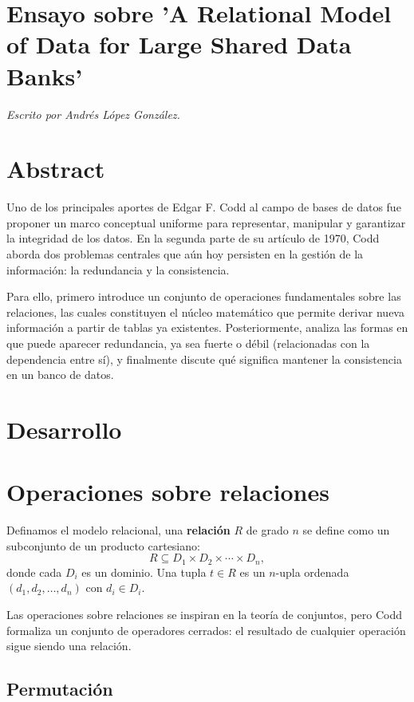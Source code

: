 \documentclass{article}
\begin{document}
\section*{Ensayo sobre 'A Relational Model of Data for Large Shared Data Banks'}
\textit{Escrito por Andrés López González.}
\section*{Abstract}
Uno de los principales aportes de Edgar F. Codd al campo de bases de datos fue proponer un marco conceptual uniforme para representar, manipular y garantizar la integridad de los datos. En la segunda parte de su artículo de 1970, Codd aborda dos problemas centrales que aún hoy persisten en la gestión de la información: la redundancia y la consistencia.

Para ello, primero introduce un conjunto de operaciones fundamentales sobre las relaciones, las cuales constituyen el núcleo matemático que permite derivar nueva información a partir de tablas ya existentes. Posteriormente, analiza las formas en que puede aparecer redundancia, ya sea fuerte o débil (relacionadas con la dependencia entre sí), y finalmente discute qué significa mantener la consistencia en un banco de datos.

\section*{Desarrollo}

\section{Operaciones sobre relaciones}

Definamos el modelo relacional, una \textbf{relación} $R$ de grado $n$ se define como un subconjunto de un producto cartesiano:
\[
R \subseteq D_1 \times D_2 \times \cdots \times D_n,
\]
donde cada $D_i$ es un dominio. Una tupla $t \in R$ es un $n$-upla ordenada $(d_1, d_2, \ldots, d_n)$ con $d_i \in D_i$.  

Las operaciones sobre relaciones se inspiran en la teoría de conjuntos, pero Codd formaliza un conjunto de operadores cerrados: el resultado de cualquier operación sigue siendo una relación.

\subsection{Permutación}
\end{document}
